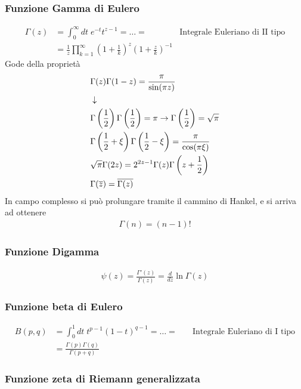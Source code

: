 \subsubsection{Funzione Gamma di Eulero}
\begin{align}
	\Gamma(z) &= \int_{0}^{\infty} dt \; e^{-t} t^{z-1} = \dots =  \quad &\text{Integrale Euleriano di II tipo}\\
	&= \frac{1}{z} \prod_{k=1}^{\infty} \left( 1+ \frac{1}{k} \right)^z \left( 1+ \frac{z}{k} \right)^{-1}
\end{align}
Gode della proprietà	
\begin{align}
	&\Gamma(z) \Gamma(1-z) = \frac{\pi}{\sin(\pi z)} \\ &\downarrow \nonumber \\
	&\Gamma\left(\frac{1}{2}\right) \Gamma\left(\frac{1}{2}\right) = \pi \rightarrow \Gamma \left( \frac{1}{2} \right) = \sqrt{\pi} \\
	&\Gamma\left(\frac{1}{2} + \xi\right) \Gamma\left(\frac{1}{2} - \xi\right) = \frac{\pi}{\cos(\pi \xi)}\\
	&\sqrt{\pi} \Gamma(2z) = 2^{2z-1} \Gamma(z) \Gamma \left( z + \frac{1}{2} \right)\\
	&\Gamma(\overline{z}) = \overline{\Gamma(z)}
\end{align}
In campo complesso si può prolungare tramite il cammino di Hankel, e si arriva ad ottenere
\begin{align}
	\Gamma(n) = (n-1)!
\end{align}

\subsubsection{Funzione Digamma}
\begin{align}
	\psi(z) = \frac{\Gamma'(z)}{\Gamma(z)} = \frac{d}{dz} \ln \Gamma (z)
\end{align}
\subsubsection{Funzione beta di Eulero}
\begin{align}
	B(p,q) &= \int_{0}^{1} dt \; t^{p-1} (1-t)^{q-1} = \dots =  \quad &\text{Integrale Euleriano di I tipo}\\
	&= \frac{\Gamma(p)\Gamma(q)}{\Gamma(p+q)}
\end{align}

\subsubsection{Funzione zeta di Riemann generalizzata}

